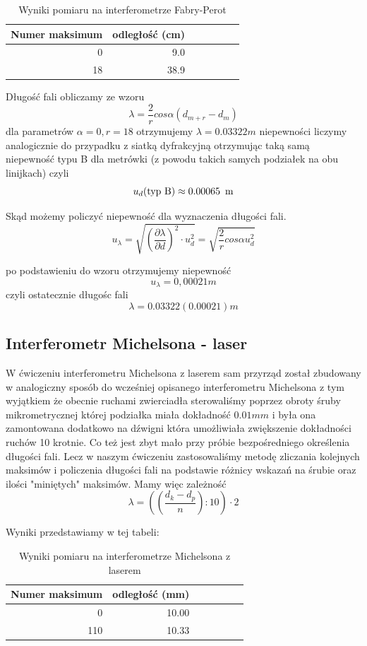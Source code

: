 \documentclass[a4paper]{article}
\newlength{\du}
\begin{document}
\begin{table}[h!]
\centering
\begin{tabular}{rrrrrrr}
\toprule
Numer maksimum & odległość (cm) \\
\midrule
0 & 9.0 \\
18 & 38.9 \\
\bottomrule
\end{tabular}
\caption{Wyniki pomiaru na interferometrze Fabry-Perot}
\label{pomiary_fabry_perot}
\end{table}

Długość fali obliczamy ze wzoru
$$\lambda = \frac{2}{r}cos \alpha (d_{m+r} - d_{m})$$
dla parametrów
$\alpha = 0, r = 18$
otrzymujemy $\lambda = 0.03322 m$
niepewności liczymy analogicznie do przypadku z siatką dyfrakcyjną otrzymując taką samą niepewność typu B dla metrówki (z powodu takich samych podziałek na obu linijkach) czyli
$$u_d (\text{typ B}) \approx 0.00065 \enskip \text{m}$$

Skąd możemy policzyć niepewność dla wyznaczenia długości fali. 
$$u_{\lambda} = \sqrt{(\frac{\partial \lambda}{\partial d})^2 \cdot u_d^2 } = \sqrt{\frac{2}{r}cos \alpha u_d^2}$$

po podstawieniu do wzoru otrzymujemy niepewność
$$u_{\lambda} = 0,00021 m$$
czyli ostatecznie długośc fali $$\lambda = 0.03322(0.00021)m$$

\subsection{Interferometr Michelsona - laser}
W ćwiczeniu interferometru Michelsona z laserem sam przyrząd został zbudowany w analogiczny sposób do wcześniej opisanego interferometru Michelsona z tym wyjątkiem że obecnie ruchami zwierciadła sterowaliśmy poprzez obroty śruby mikrometrycznej której podziałka miała dokładność
$0.01 mm$ i była ona zamontowana dodatkowo na dźwigni która umożliwiała zwiększenie dokładności ruchów 10 krotnie. Co też jest zbyt mało przy próbie bezpośredniego określenia długości fali. Lecz w naszym ćwiczeniu zastosowaliśmy metodę zliczania kolejnych maksimów i policzenia długości fali na podstawie różnicy wskazań na śrubie oraz ilości "miniętych" maksimów.
Mamy więc zależność
$$\lambda = ((\frac{d_{k} - d_{p}}{n}):10) \cdot 2$$

Wyniki przedstawiamy w tej tabeli:


\begin{table}
\centering
\begin{tabular}{rrrrrrr}
\toprule
Numer maksimum & odległość (mm) \\
\midrule
0 & 10.00 \\
110 & 10.33 \\
\bottomrule
\end{tabular}
\caption{Wyniki pomiaru na interferometrze Michelsona z laserem}
\label{pomiary_michelsona_laser}
\end{table}
\end{document}
